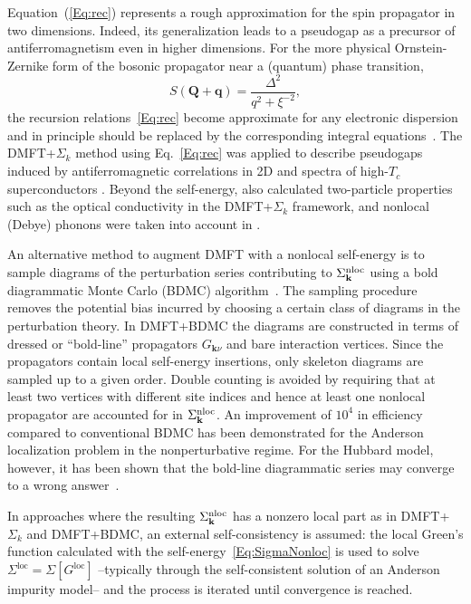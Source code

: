 \documentclass[rmp,aps,reprint,amsmath,amssymb,superscriptaddress,showpacs,nofootinbib]{revtex4-1}
\newcommand{\kv}{\ensuremath{\mathbf{k}}}
\begin{document}
Equation~(\ref{Eq:rec}) represents a rough approximation for the spin propagator in two dimensions. Indeed, its generalization leads to a pseudogap as a precursor of antiferromagnetism even in higher dimensions. For the more physical Ornstein-Zernike form of the bosonic propagator near a (quantum) phase transition, 
\begin{equation}
  S(\mathbf{Q}+\mathbf{q})=\frac{\Delta ^{2}}{q^{2}+\xi ^{-2}},
\end{equation}
the recursion relations~\eqref{Eq:rec} become approximate for any electronic dispersion and in principle should be replaced by the corresponding integral equations~\cite{Katanin2005}. The DMFT+$\Sigma _{k}$ method using Eq.~\eqref{Eq:rec}  was applied to describe pseudogaps induced by antiferromagnetic correlations in 2D  \cite{Sadovskii2005,Kuchinskii2005,Kuchinskii2006} and spectra of high-$T_c$ superconductors  \cite{Nekrasov2008,Nekrasov2011}. Beyond the self-energy,  also calculated two-particle properties such as the  optical conductivity in the DMFT+$\Sigma_k$ framework, and  nonlocal (Debye) phonons  were taken into account in .

An alternative method to augment DMFT with a nonlocal self-energy is to sample diagrams of the perturbation series contributing to $\Sigma^{\rm nloc}_{\kv}$ using a bold diagrammatic Monte Carlo (BDMC) algorithm~\cite{Pollet2011}. The sampling procedure removes the potential bias incurred by choosing a certain class of diagrams in the perturbation theory. In DMFT+BDMC the diagrams are constructed in terms of dressed or ``bold-line'' propagators $G_{\kv \nu}$ and bare interaction vertices. Since the propagators contain local self-energy insertions, only skeleton diagrams are sampled up to a given order. Double counting is avoided by requiring that at least two vertices with different site indices and hence at least one nonlocal propagator are accounted for in $\Sigma^{\rm nloc}_{\kv}$. An improvement of $10^{4}$ in efficiency compared to conventional BDMC has been demonstrated for the Anderson localization problem in the nonperturbative regime. For the Hubbard model, however, it has been shown that the bold-line diagrammatic series may converge to a wrong answer~\cite{Kozik2015}.

In approaches where the resulting ${\Sigma}^{\rm nloc}_{\mathbf{k}}$ has a nonzero local part as in DMFT+$\Sigma_{k}$ and DMFT+BDMC, an external self-consistency is assumed: the local Green's function calculated with the self-energy~\eqref{Eq:SigmaNonloc} is used to solve $\Sigma^{\text{loc}}=\Sigma[G^{\text{loc}}]$ --typically through the self-consistent solution of an Anderson impurity model-- and the process is iterated until convergence is reached.
\end{document}
